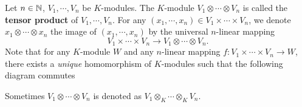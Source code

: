 \begin{definitionenv}
    Let $n\in \mathbb{N}$, $V_1,\cdots, V_n$ be $K$-modules.
    The $K$-module $V_1\otimes \cdots \otimes V_n$ is called the \textbf{tensor product} of $V_1,\cdots, V_n$.
    For any $(x_1,\cdots,x_n) \in V_1\times \cdots \times V_n$, we denote $x_1\otimes \cdots \otimes x_n$ the image of $(x_1,\cdots,x_n)$ by the universal $n$-linear mapping
    $$ V_1\times \cdots \times V_n \rightarrow V_1\otimes \cdots \otimes V_n.$$
    Note that for any $K$-module $W$ and any $n$-linear mapping $f: V_1\times \cdots \times V_n \rightarrow W$, there exists a \textit{unique} homomorphism of $K$-modules such that the following diagram commutes
    \begin{center}
    \end{center}

Sometimes $V_1 \otimes \cdots \otimes V_n$ is denoted as $V_1 \otimes_{K} \cdots \otimes_{K} V_n$.
\end{definitionenv}

